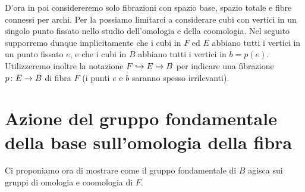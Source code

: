 D'ora in poi considereremo solo fibrazioni con spazio base, spazio totale e fibre connessi per archi. Per la  possiamo limitarci a considerare cubi con vertici in un singolo punto fissato nello studio dell'omologia e della coomologia. Nel seguito supporremo dunque implicitamente che i cubi in \(F\) ed \(E\) abbiano tutti i vertici in un punto fissato \(e\), e che i cubi in \(B\) abbiano tutti i vertici in \(b=p(e)\). Utilizzeremo inoltre la notazione \(F\hookrightarrow E\to B\) per indicare una fibrazione \(\map{p}{E}{B}\) di fibra \(F\) (i punti \(e\) e \(b\) saranno spesso irrilevanti).

\section{Azione del gruppo fondamentale della base sull'omologia della fibra}

Ci proponiamo ora di mostrare come il gruppo fondamentale di \(B\) agisca sui gruppi di omologia e coomologia di \(F\).


